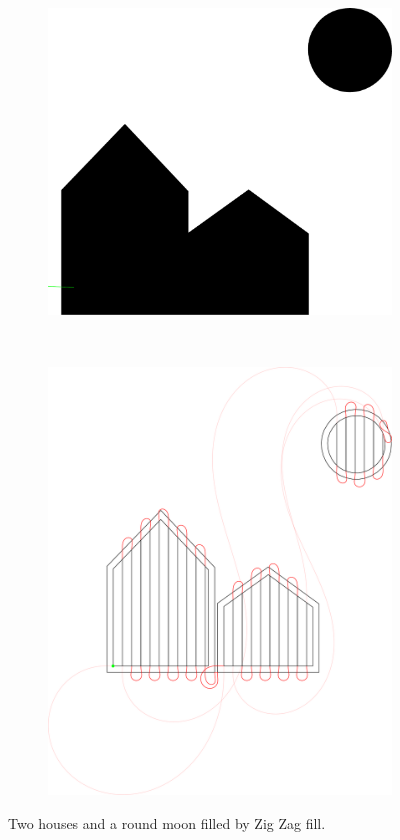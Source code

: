 \begin{figure}[h]
\centering
\begin{subfigure}[t]{0.45\textwidth}
\centering
	\includegraphics[width=\textwidth]{images/results/house_moon.pdf}

\end{subfigure}~
\begin{subfigure}[t]{0.45\textwidth}
\centering
	\includegraphics[width=\textwidth]{images/results/house_test.pdf}
\end{subfigure}
	\caption{Two houses and a round moon filled by Zig Zag fill.}
\end{figure}
